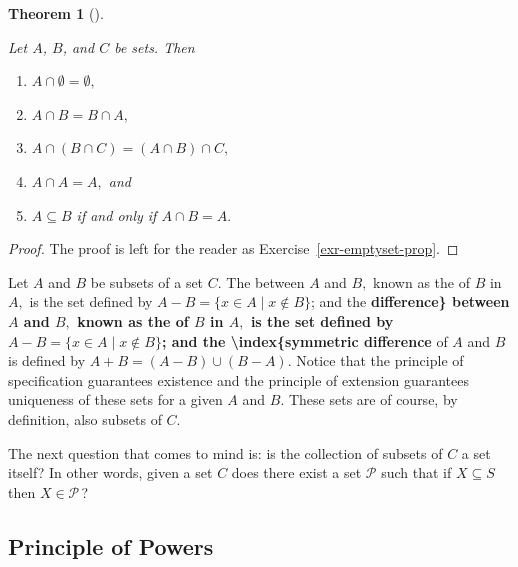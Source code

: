 \documentclass[
  letterpaper,
  10pt,
  reqno,
  twopage,
  openany]{book}
\providecommand{\tightlist}{%
  \setlength{\itemsep}{0pt}\setlength{\parskip}{0pt}}\usepackage{longtable,booktabs,array}
\theoremstyle{plain}
\theoremstyle{definition}
\theoremstyle{definition}
\theoremstyle{definition}
\theoremstyle{plain}
\theoremstyle{plain}
\newtheorem{theorem}{Theorem}[chapter]
\theoremstyle{remark}
\begin{document}
\leavevmode{}%
\begin{theorem}[]\label{thm-emptyset-prop}

Let \(A\), \(B\), and \(C\) be sets. Then

\begin{enumerate}
\def\labelenumi{\arabic{enumi}.}
\tightlist
\item
  \(A\cap \emptyset =\emptyset ,\)
\item
  \(A\cap B=B\cap A,\)
\item
  \(A\cap (B \cap C) =(A\cap B)\cap C,\)
\item
  \(A \cap A =A,\) and
\item
  \(A\subseteq B\) if and only if \(A\cap B=A.\)
\end{enumerate}

\end{theorem}

\begin{proof}

The proof is left for the reader as Exercise~\ref{exr-emptyset-prop}.

\end{proof}

Let \(A\) and \(B\) be subsets of a set \(C.\) The 
between \(A\) and \(B,\) known as the  of
\(B\) in \(A,\) is the set defined by
\(A-B=\{x\in A \mid x\not\in B \}\); and the
 \textbf{difference\} between \(A\) and
\(B,\) known as the  of \(B\) in \(A,\) is
the set defined by \(A-B=\{x\in A \mid x\not\in B \}\); and the
\textbackslash index\{symmetric difference} of \(A\) and \(B\) is
defined by \(A+B=(A-B)\cup (B-A).\) Notice that the principle of
specification guarantees existence and the principle of extension
guarantees uniqueness of these sets for a given \(A\) and \(B.\) These
sets are of course, by definition, also subsets of \(C.\)

The next question that comes to mind is: is the collection of subsets of
\(C\) a set itself? In other words, given a set \(C\) does there exist a
set \(\mathcal{P}\) such that if \(X\subseteq S\) then
\(X\in \mathcal{P}\,\)?

\hypertarget{principle-of-powers}{%
\subsection{Principle of Powers}\label{principle-of-powers}}
\end{document}
